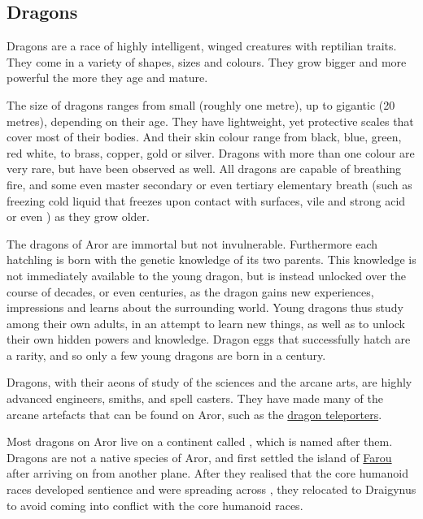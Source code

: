 \subsection{Dragons}
\label{sec:Dragons}

Dragons are a race of highly intelligent, winged creatures with reptilian
traits. They come in a variety of shapes, sizes and colours. They grow bigger
and more powerful the more they age and mature.

The size of dragons ranges from small (roughly one metre), up to gigantic (20
metres), depending on their age. They have lightweight, yet protective scales
that cover most of their bodies. And their skin colour range from black, blue,
green, red white, to brass, copper, gold or silver. Dragons with more than
one colour are very rare, but have been observed as well. All dragons are
capable of breathing fire, and some even master secondary or even tertiary
elementary breath (such as freezing cold liquid that freezes upon contact with
surfaces, vile and strong acid or even ) as they grow
older.

The dragons of Aror are immortal but not invulnerable. Furthermore each
hatchling is born with the genetic knowledge of its two parents. This knowledge
is not immediately available to the young dragon, but is instead unlocked
over the course of decades, or even centuries, as the dragon gains new
experiences, impressions and learns about the surrounding world. Young dragons
thus study among their own adults, in an attempt to learn new things, as well as
to unlock their own hidden powers and knowledge. Dragon eggs that successfully
hatch are a rarity, and so only a few young dragons are born in a century.

Dragons, with their aeons of study of the sciences and the arcane arts, are
highly advanced engineers, smiths, and spell casters. They have made many of
the arcane artefacts that can be found on Aror, such as the
\hyperref[sec:Dragon Teleporter]{dragon teleporters}.


Most dragons on Aror live on a continent called , which
is named after them. Dragons are not a native species of Aror, and first
settled the island of \hyperref[sec:Farou Island]{Farou} after arriving on
 from another plane. After they realised that the core
humanoid races developed sentience and were spreading across
, they relocated to Draigynus to avoid coming into conflict
with the core humanoid races.

